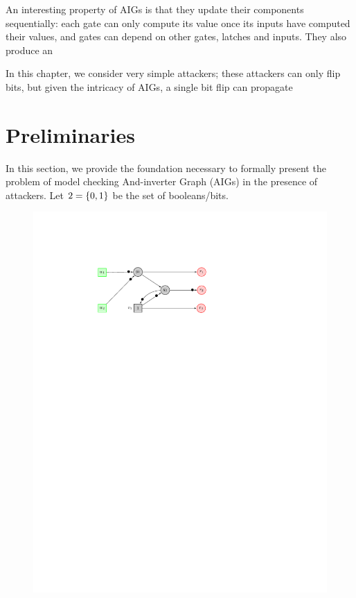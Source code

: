 {An interesting property of AIGs is that they update their components sequentially: each gate can only compute its value once its inputs have computed their values, and gates can depend on other gates, latches and inputs. They also produce an 

In this chapter, we consider very simple attackers; these attackers can only flip bits, but given the intricacy of AIGs, a single bit flip can propagate 

\section{Preliminaries}
\label{sec:preliminaries}
In this section, we provide the foundation necessary to formally present 
the problem of model checking {And-inverter Graph} (AIGs) in the presence of attackers. 
Let $2=\left\{0,1\right\}$ be the set of booleans/bits. 
\begin{figure}[!t]
\begin{minipage}{0.6\textwidth}
\begin{framed}
\includegraphics[width=\textwidth]{Example.pdf}

\end{framed}
\end{minipage}
\end{figure}}
